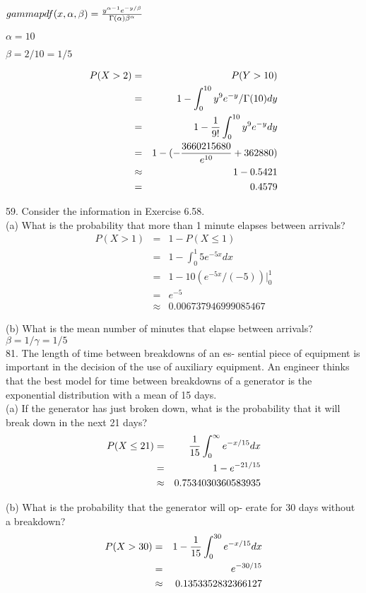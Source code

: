 $gammapdf(x,\alpha,\beta) = \frac{y^{\alpha-1}e^{-y/\beta}}{\Gamma(\alpha) \beta^\alpha}$

$\alpha = 10$

$\beta = 2/10 = 1/5$

\begin{eqnarray*}
P(X > 2) & = & P(Y > 10)  \\
            & = & 1- \int^{10}_0 y^9e^{-y}/\Gamma(10) dy \\
            & = & 1- \frac{1}{9!}\int^{10}_0 y^9e^{-y} dy \\
            & = & 1 -(-\frac{3660215680}{e^{10}} + 362880) \\
            & \approx & 1- 0.5421 \\
            & = & 0.4579
\end{eqnarray*}

59. Consider the information in Exercise 6.58. \\

(a) What is the probability that more than 1 minute
elapses between arrivals? \\

\begin{eqnarray*}
P(X > 1) & = & 1 - P(X \leq 1) \\
         & = & 1 - \int^1_0 5e^{-5x} dx \\
         & = & 1 - 10(e^{-5x}/(-5)) |^1_0 \\
         & = & e^{-5} \\
         & \approx & 0.006737946999085467
\end{eqnarray*}

(b) What is the mean number of minutes that elapse
between arrivals? \\

$\beta = 1/\gamma = 1/5$ \\

81. The length of time between breakdowns of an es-
sential piece of equipment is important in the decision
of the use of auxiliary equipment. An engineer thinks
that the best model for time between breakdowns of a
generator is the exponential distribution with a mean
of 15 days. \\

(a) If the generator has just broken down, what is the
probability that it will break down in the next 21
days? \\

\begin{eqnarray*}
P(X \leq 21) &=& \frac{1}{15} \int^\infty _0  e^{-x/15} dx \\
& = & 1 - e^{-21/15}  \\
& \approx & 0.7534030360583935
\end{eqnarray*}

(b) What is the probability that the generator will op-
erate for 30 days without a breakdown? \\

\begin{eqnarray*}
P(X > 30) &=& 1 - \frac{1}{15} \int^{30} _0  e^{-x/15} dx \\
& = & e^{-30/15}  \\
& \approx & 0.1353352832366127
\end{eqnarray*}

